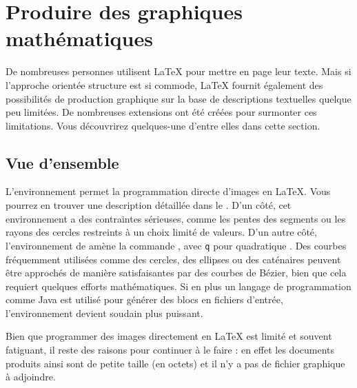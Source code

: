 \setcounter{chapter}{4}
\newcommand{\graphicscompanion}{\emph{The \LaTeX{} Graphics Companion}~\cite{graphicscompanion}} 
\newcommand{\hobby}{\emph{A User's Manual for MetaPost}~\cite{metapost}}
\newcommand{\hoenig}{\emph{\TeX{} Unbound}~\cite{unbound}}
\newcommand{\graphicsinlatex}{\emph{Graphics in \LaTeXe{}}~\cite{ursoswald}}

\chapter{Produire des graphiques mathématiques}

\begin{intro}
De nombreuses personnes utilisent \LaTeX{} pour mettre en page leur
texte. Mais si l'approche \og orientée structure \fg{} est si
commode, \LaTeX{} fournit également des possibilités de production
graphique sur la base de descriptions textuelles quelque peu
limitées. De nombreuses extensions ont été créées pour surmonter ces
limitations. Vous découvrirez quelques-une d'entre elles dans cette
section.
\end{intro}

\section{Vue d'ensemble}

L'environnement  permet la programmation directe d'images
en \LaTeX. Vous pourrez en trouver une description détaillée dans le
\manuel. D'un côté, cet environnement a des contraintes sérieuses,
comme les pentes des segments ou les rayons des cercles restreints à
un choix limité de valeurs. D'un autre côté, l'environnement
 de \LaTeXe{} amène la commande , avec \og
\texttt{q} \fg{} pour \og quadratique \fg{}. Des courbes fréquemment
utilisées comme des cercles, des ellipses ou des caténaires peuvent
être approchés de manière satisfaisantes par des courbes de B\'ezier,
bien que cela requiert quelques efforts mathématiques. Si en plus un
langage de programmation comme Java est utilisé pour générer des blocs
 en fichiers d'entrée, l'environnement 
devient soudain plus puissant.

Bien que programmer des images directement en \LaTeX{} est limité et
souvent fatiguant, il reste des raisons pour continuer à le faire : en
effet les documents produits ainsi sont de petite taille (en octets)
et il n'y a pas de fichier graphique à adjoindre.

